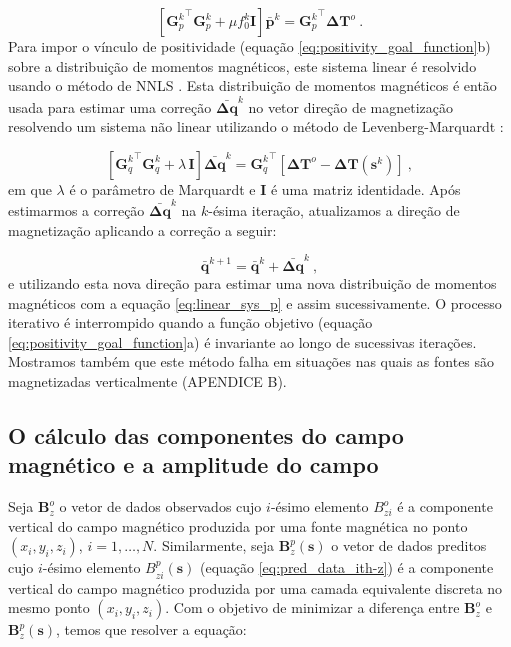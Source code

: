 \begin{equation}
\left[ {\mathbf{G}_{p}^{k}}^{\top} \mathbf{G}_{p}^{k} + 
\mu f_{0}^{k} \mathbf{I} \right] \bar{\mathbf{p}}^{k} = {\mathbf{G}_{p}^{k}}^{\top} \mathbf{\Delta T}^{o} \: .
\label{eq:linear_sys_p}
\end{equation}
Para impor o vínculo de positividade (equação \ref{eq:positivity_goal_function}b) sobre a distribuição de momentos magnéticos, este sistema linear é resolvido usando o método de NNLS \citep{lawson_hanson_1974, silvadias_etal_2010}. Esta distribuição de momentos magnéticos é então usada para estimar uma correção $\bar{\mathbf{\Delta q}}^{k}$ no vetor direção de magnetização resolvendo um sistema não linear utilizando o método de Levenberg-Marquardt \citep{aster2005}:

\begin{equation}
\left[ {\mathbf{G}_{q}^{k}}^{\top} \mathbf{G}_{q}^{k} + \lambda \, \mathbf{I} \right] 
\bar{\mathbf{\Delta q}}^{k} = {\mathbf{G}_{q}^{k}}^{\top} 
\left[ \mathbf{\Delta T}^{o} - \mathbf{\Delta T} (\mathbf{s}^{k}) \right] \: ,
\label{eq:linear_sys_q}
\end{equation}
em que $\lambda$ é o parâmetro de Marquardt e $\mathbf{I}$ é uma matriz identidade. Após estimarmos a correção $\bar{\mathbf{\Delta q}}^{k}$ na $k$-ésima iteração, atualizamos a direção de magnetização aplicando a correção a seguir:

\begin{equation}
\bar{\mathbf{q}}^{k+1} = \bar{\mathbf{q}}^{k} + \bar{\mathbf{\Delta q}}^{k} \: ,
\label{eq:q_next}
\end{equation}
e utilizando esta nova direção para estimar uma nova distribuição de momentos magnéticos com a equação \ref{eq:linear_sys_p} e assim sucessivamente. O processo iterativo é interrompido quando a função objetivo (equação \ref{eq:positivity_goal_function}a) é invariante ao longo de sucessivas iterações. Mostramos também que este método falha em situações nas quais as fontes são magnetizadas verticalmente (APENDICE B).

\subsection{O cálculo das componentes do campo magnético e a amplitude do campo}
\label{subsec:componentes_vec}

Seja $\mathbf{B}_{z}^{o}$ o vetor de dados observados cujo $i$-ésimo elemento $B_{zi}^{o}$ é a componente vertical do campo magnético produzida por uma fonte magnética no ponto $(x_{i},y_{i},z_{i})$, $i = 1, \dots, N$. Similarmente, seja $\mathbf{B}_{z}^{p} (\mathbf{s})$ o vetor de dados preditos cujo $i$-ésimo elemento $B_{zi}^{p}(\mathbf{s})$ (equação \ref{eq:pred_data_ith-z}) é a componente vertical do campo magnético produzida por uma camada equivalente discreta no mesmo ponto $(x_{i},y_{i},z_{i})$. Com o objetivo de minimizar a diferença entre $\mathbf{B}_{z}^{o}$ e $\mathbf{B}_{z}^{p} (\mathbf{s})$, temos que resolver a equação:

